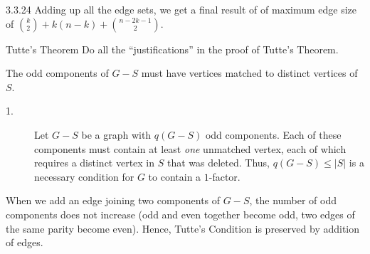 \documentclass[9pt]{extarticle}
\begin{document}
{\begin{problem}{3.3.24}
    Adding up all the edge sets, we get a final result of of maximum edge size of ${k\choose 2} + k(n-k) + {n-2k-1\choose 2}$.
  \end{problem}
  \begin{problem}{Tutte's Theorem}
    Do all the ``justifications'' in the proof of Tutte's Theorem.
    \tcblower
    \begin{description}[font=\scshape]
      \item[Necessity] The odd components of $G-S$ must have vertices matched to distinct vertices of $S$.
        \begin{description}
          \item[1.] Let $G-S$ be a graph with $q(G-S)$ odd components. Each of these components must contain at least \textit{one} unmatched vertex, each of which requires a distinct vertex in $S$ that was deleted. Thus, $q(G-S) \leq |S|$ is a necessary condition for $G$ to contain a $1$-factor.
        \end{description}
      \item[Sufficiency] When we add an edge joining two components of $G-S$, the number of odd components does not increase (odd and even together become odd, two edges of the same parity become even). Hence, Tutte's Condition is preserved by addition of edges.\\


\end{description}
\end{problem}}
\end{document}
